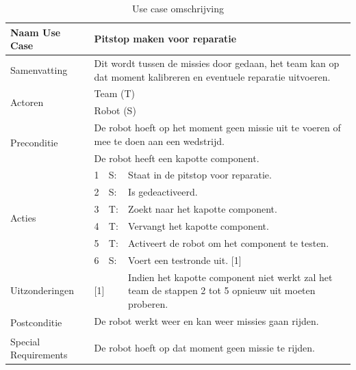 \documentclass[12pt]{article} %
\begin{document}
\begin{table}[htbp]
  \centering
  \caption{Use case omschrijving}
    \begin{tabular}{llll}
    \toprule
    Naam Use Case & \multicolumn{3}{l}{\textbf{Pitstop maken voor reparatie}} \\
    \midrule
    Samenvatting & \multicolumn{3}{l}{Dit wordt tussen de missies door gedaan, het team kan op dat moment kalibreren en eventuele reparatie uitvoeren.} \\
    \multirow{2}[1]{*}{Actoren} & \multicolumn{3}{l}{Team (T)} \\
          & \multicolumn{3}{l}{Robot (S)} \\
    \multirow{2}[1]{*}{Preconditie} & \multicolumn{3}{l}{De robot hoeft op het moment geen missie uit te voeren of mee te doen aan een wedstrijd.} \\
          & \multicolumn{3}{l}{De robot heeft een kapotte component.} \\
    \multirow{6}[11]{*}{Acties} & 1     & S:    & Staat in de pitstop voor reparatie. \\
          & 2     & S:    & Is gedeactiveerd. \\
          & 3     & T:    & Zoekt naar het kapotte component. \\
          & 4     & T:    & Vervangt het kapotte component. \\
          & 5     & T:    & Activeert de robot om het component te testen. \\
          & 6     & S:    & Voert een testronde uit. [1] \\
    Uitzonderingen & \multicolumn{2}{l}{[1]} & Indien het kapotte component niet werkt zal het team de stappen 2 tot 5 opnieuw uit moeten proberen. \\
    \multirow{2}[1]{*}{Postconditie} & \multicolumn{3}{l}{De robot werkt weer en kan weer missies gaan rijden.} \\
          & \multicolumn{3}{l}{} \\
    Special Requirements  & \multicolumn{3}{l}{De robot hoeft op dat moment geen missie te rijden.} \\
    \bottomrule
    \end{tabular}%
  \label{tab:addlabel}%
\end{table}%
\clearpage
\end{document}
